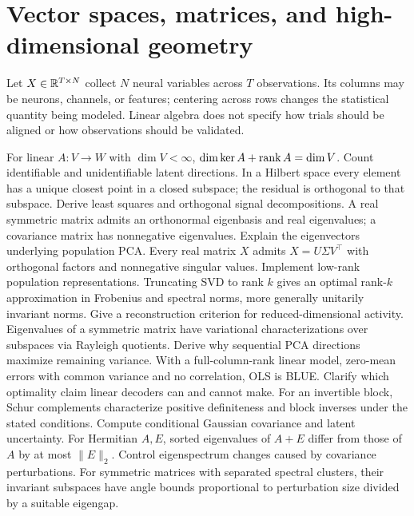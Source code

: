\chapter{Vector spaces, matrices, and high-dimensional geometry}
Let $X\in\mathbb{R}^{T\times N}$ collect $N$ neural variables across $T$
observations. Its columns may be neurons, channels, or features;
centering across rows changes the statistical quantity being modeled.
Linear algebra does not specify how trials should be aligned or how
observations should be validated.

{For linear $A:V\to W$ with $\dim V<\infty$,
$\dim\ker A+\operatorname{rank} A=\dim V$.}
{Count identifiable and unidentifiable latent directions.}
{In a Hilbert space every element has a unique closest
point in a closed subspace; the residual is orthogonal to that subspace.}
{Derive least squares and orthogonal signal decompositions.}
{A real symmetric matrix admits an orthonormal eigenbasis and real
eigenvalues; a covariance matrix has nonnegative eigenvalues.}
{Explain the eigenvectors underlying population PCA.}
{Every real matrix $X$ admits $X=U\Sigma V^\top$
with orthogonal factors and nonnegative singular values.}
{Implement low-rank population representations.}
{Truncating SVD to rank $k$ gives an optimal rank-$k$ approximation
in Frobenius and spectral norms, more generally unitarily invariant norms.}
{Give a reconstruction criterion for reduced-dimensional activity.}
{Eigenvalues of a symmetric matrix have variational characterizations
over subspaces via Rayleigh quotients.}
{Derive why sequential PCA directions maximize remaining variance.}
{With a full-column-rank linear model, zero-mean errors
with common variance and no correlation, OLS is BLUE.}
{Clarify which optimality claim linear decoders can and cannot make.}
{For an invertible block, Schur complements characterize
positive definiteness and block inverses under the stated conditions.}
{Compute conditional Gaussian covariance and latent uncertainty.}
{For Hermitian $A,E$, sorted eigenvalues of $A+E$ differ
from those of $A$ by at most $\|E\|_2$.}
{Control eigenspectrum changes caused by covariance perturbations.}
{For symmetric matrices with separated spectral clusters,
their invariant subspaces have angle bounds proportional
to perturbation size divided by a suitable eigengap.}
